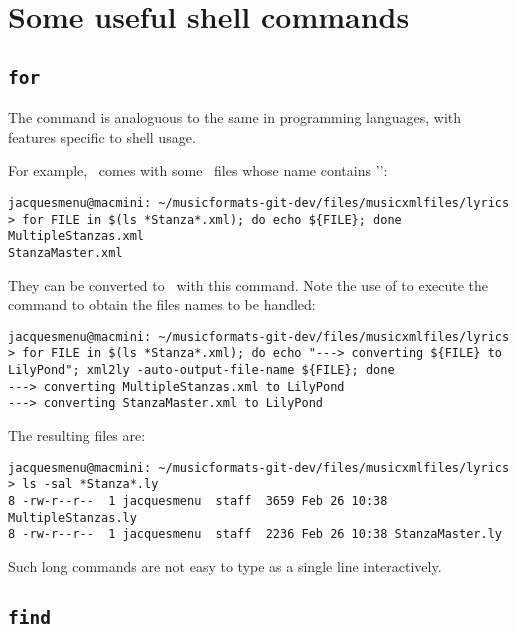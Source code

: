 \section{Some useful shell commands}

\subsection{{\tt for}}

The  command is analoguous to the same in programming languages, with features specific to shell usage.

For example, \mf\ comes with some \mxml\ files whose name contains '':
\begin{lstlisting}[language=Terminal]
jacquesmenu@macmini: ~/musicformats-git-dev/files/musicxmlfiles/lyrics > for FILE in $(ls *Stanza*.xml); do echo ${FILE}; done
MultipleStanzas.xml
StanzaMaster.xml
\end{lstlisting}

They can be converted to \lily\ with this  command. Note the use of  to execute the  command to obtain the files names to be handled:
\begin{lstlisting}[language=Terminal]
jacquesmenu@macmini: ~/musicformats-git-dev/files/musicxmlfiles/lyrics > for FILE in $(ls *Stanza*.xml); do echo "---> converting ${FILE} to LilyPond"; xml2ly -auto-output-file-name ${FILE}; done
---> converting MultipleStanzas.xml to LilyPond
---> converting StanzaMaster.xml to LilyPond
\end{lstlisting}

The resulting files are:
\begin{lstlisting}[language=Terminal]
jacquesmenu@macmini: ~/musicformats-git-dev/files/musicxmlfiles/lyrics > ls -sal *Stanza*.ly
8 -rw-r--r--  1 jacquesmenu  staff  3659 Feb 26 10:38 MultipleStanzas.ly
8 -rw-r--r--  1 jacquesmenu  staff  2236 Feb 26 10:38 StanzaMaster.ly
\end{lstlisting}

Such long  commands are not easy to type as a single line interactively.


\subsection{{\tt find}}

